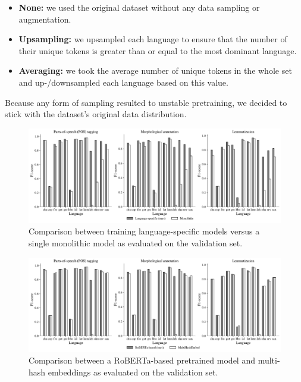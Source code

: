 \documentclass[11pt]{article}
\begin{document}
\begin{itemize}
  \item \textbf{None:} we used the original dataset without any data sampling or augmentation.
  \item \textbf{Upsampling:} we upsampled each language to ensure that the number of their unique tokens is greater than or equal to the most dominant language.
  \item \textbf{Averaging:} we took the average number of unique tokens in the whole set and up-/downsampled each language based on this value.
\end{itemize}

Because any form of sampling resulted to unstable pretraining, we decided to stick with the dataset's original data distribution.

\begin{figure}[t]
\centering
\includegraphics[width=\textwidth]{figures/monolithic.pdf}
\caption{Comparison between training language-specific models versus a single monolithic model as evaluated on the validation set.}
\label{fig:monolithic}
\end{figure}

\begin{figure}[t]
\centering
\includegraphics[width=\textwidth]{figures/hashembed.pdf}
\caption{Comparison between a RoBERTa-based pretrained model and multi-hash embeddings \cite{miranda-etal-2022-multi} as evaluated on the validation set.}
\label{fig:hashembed}
\end{figure}
\end{document}
